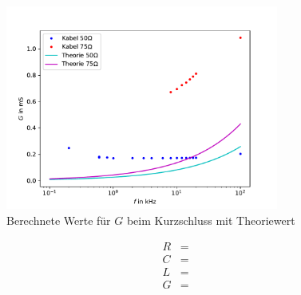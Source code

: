 \begin{figure}[h]
	\centering
	\includegraphics[width=0.8\textwidth]{RLC_DirekteMessung/build/PlotG.pdf}
	\caption[Werte für $G$]{Berechnete Werte für $G$ beim Kurzschluss mit Theoriewert}
	\label{fig:PlotG}
\end{figure}
\begin{align}
	R &=  \\
	C &=  \\
	L &=  \\
	G &= 
\end{align}